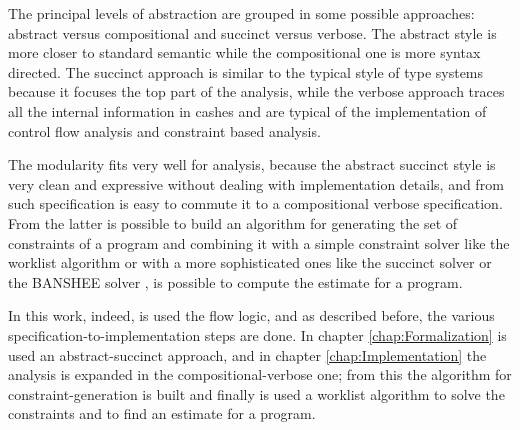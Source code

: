 The principal levels of abstraction are grouped in some possible approaches: abstract versus compositional and succinct versus verbose. The abstract style is more closer to standard semantic while the compositional one is more syntax directed. The succinct approach is similar to the typical style of type systems because it focuses the top part of the analysis, while the verbose approach traces all the internal information in cashes and are typical of the implementation of control flow analysis and constraint based analysis.


The modularity fits very well for analysis, because the abstract succinct style is very clean and expressive without dealing with implementation details, and from such specification is easy to commute it to a compositional verbose specification. From the latter is possible to build an algorithm for generating the set of constraints of a program and combining it with a simple constraint solver like the worklist algorithm \cite{PrincipleProgramAnalysis} or with a more sophisticated ones like the succinct solver \cite{SuccinctSolver} or the BANSHEE solver \cite{BansheeSolver}, is possible to compute the estimate for a program. 

In this work, indeed, is used the flow logic, and as described before, the various specification-to-implementation steps are done. In chapter \ref{chap:Formalization} is used an abstract-succinct approach, and in chapter \ref{chap:Implementation}  the analysis is expanded in the compositional-verbose one; from this the algorithm for constraint-generation is built and finally is used a worklist algorithm to solve the constraints and to find an estimate for a program. 